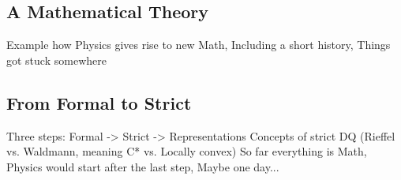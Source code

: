\subsection{A Mathematical Theory}
\label{subsec:chap2_MathTheory}
Example how Physics gives rise to new Math,
Including a short history,
Things got stuck somewhere


\subsection{From Formal to Strict}
\label{subsec:chap2_Formal2Strict}
Three steps: Formal -> Strict -> Representations
Concepts of strict DQ (Rieffel vs. Waldmann,
meaning C* vs. Locally convex)
So far everything is Math, Physics would start after the last step, Maybe one day...
